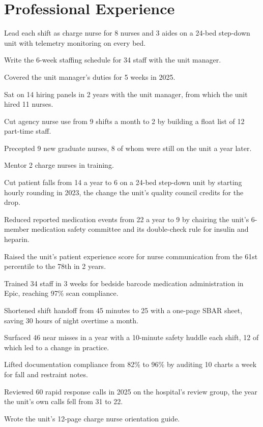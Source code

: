 \documentclass{resume}
\begin{document}
\section{Professional Experience}
\begin{bullets}
  \item Lead each shift as charge nurse for 8 nurses and 3 aides on a 24-bed step-down unit with telemetry monitoring on every bed.
  \item Write the 6-week staffing schedule for 34 staff with the unit manager.
  \item Covered the unit manager's duties for 5 weeks in 2025.
  \item Sat on 14 hiring panels in 2 years with the unit manager, from which the unit hired 11 nurses.
  \item Cut agency nurse use from 9 shifts a month to 2 by building a float list of 12 part-time staff.
  \item Precepted 9 new graduate nurses, 8 of whom were still on the unit a year later.
  \item Mentor 2 charge nurses in training.
  \item Cut patient falls from 14 a year to 6 on a 24-bed step-down unit by starting hourly rounding in 2023, the change the unit's quality council credits for the drop.
  \item Reduced reported medication events from 22 a year to 9 by chairing the unit's 6-member medication safety committee and its double-check rule for insulin and heparin.
  \item Raised the unit's patient experience score for nurse communication from the 61st percentile to the 78th in 2 years.
  \item Trained 34 staff in 3 weeks for bedside barcode medication administration in Epic, reaching 97\% scan compliance.
  \item Shortened shift handoff from 45 minutes to 25 with a one-page SBAR sheet, saving 30 hours of night overtime a month.
  \item Surfaced 46 near misses in a year with a 10-minute safety huddle each shift, 12 of which led to a change in practice.
  \item Lifted documentation compliance from 82\% to 96\% by auditing 10 charts a week for fall and restraint notes.
  \item Reviewed 60 rapid response calls in 2025 on the hospital's review group, the year the unit's own calls fell from 31 to 22.
  \item Wrote the unit's 12-page charge nurse orientation guide.
\end{bullets}
\end{document}
